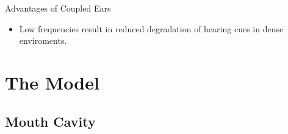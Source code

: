\documentclass{beamer}
\begin{document}
\begin{frame}
 \begin{exampleblock}{Advantages of Coupled Ears}
 \begin{itemize}
  \item Low frequencies result in reduced degradation of hearing cues in dense enviroments.
 \end{itemize}

  
 \end{exampleblock}

\end{frame}

\section{The Model}

\subsection{Mouth Cavity}
\end{document}
